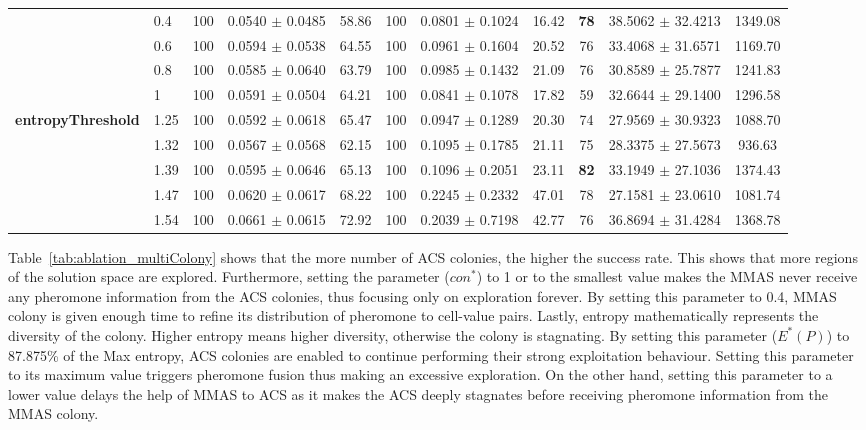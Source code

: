 \begin{table}[H]
{\begin{tabular}{@{}llccc ccc ccc@{}}
        & 0.4  & 100 & 0.0540 $\pm$ 0.0485 & 58.86 & 100 & 0.0801 $\pm$ 0.1024 & 16.42 & \textbf{78} & 38.5062 $\pm$ 32.4213 & 1349.08 \\
        & 0.6  & 100 & 0.0594 $\pm$ 0.0538 & 64.55 & 100 & 0.0961 $\pm$ 0.1604 & 20.52 & 76 & 33.4068 $\pm$ 31.6571 & 1169.70 \\
        & 0.8  & 100 & 0.0585 $\pm$ 0.0640 & 63.79 & 100 & 0.0985 $\pm$ 0.1432 & 21.09 & 76 & 30.8589 $\pm$ 25.7877 & 1241.83 \\
        & 1    & 100 & 0.0591 $\pm$ 0.0504 & 64.21 & 100 & 0.0841 $\pm$ 0.1078 & 17.82 & 59 & 32.6644 $\pm$ 29.1400 & 1296.58 \\
        \midrule
        \multirow{5}{*}{\textbf{entropyThreshold}} 
        & 1.25 & 100 & 0.0592 $\pm$ 0.0618 & 65.47 & 100 & 0.0947 $\pm$ 0.1289 & 20.30 & 74 & 27.9569 $\pm$ 30.9323 & 1088.70 \\
        & 1.32 & 100 & 0.0567 $\pm$ 0.0568 & 62.15 & 100 & 0.1095 $\pm$ 0.1785 & 21.11 & 75 & 28.3375 $\pm$ 27.5673 & 936.63 \\
        & 1.39 & 100 & 0.0595 $\pm$ 0.0646 & 65.13 & 100 & 0.1096 $\pm$ 0.2051 & 23.11 & \textbf{82} & 33.1949 $\pm$ 27.1036 & 1374.43 \\
        & 1.47 & 100 & 0.0620 $\pm$ 0.0617 & 68.22 & 100 & 0.2245 $\pm$ 0.2332 & 47.01 & 78 & 27.1581 $\pm$ 23.0610 & 1081.74 \\
        & 1.54 & 100 & 0.0661 $\pm$ 0.0615 & 72.92 & 100 & 0.2039 $\pm$ 0.7198 & 42.77 & 76 & 36.8694 $\pm$ 31.4284 & 1368.78 \\
        \bottomrule
    \end{tabular}}
\end{table}

Table~\ref{tab:ablation_multiColony} shows that the more number of ACS colonies, the higher the success rate. This shows that more regions of the solution space are explored. Furthermore, setting the parameter ($con^*$) to 1 or to the smallest value makes the MMAS never receive any pheromone information from the ACS colonies, thus focusing only on exploration forever. By setting this parameter to 0.4, MMAS colony is given enough time to refine its distribution of pheromone to cell-value pairs. Lastly, entropy mathematically represents the diversity of the colony. Higher entropy means higher diversity, otherwise the colony is stagnating. By setting this parameter ($E^*(P)$) to 87.875\% of the Max entropy, ACS colonies are enabled to continue performing their strong exploitation behaviour. Setting this parameter to its maximum value triggers pheromone fusion thus making an excessive exploration. On the other hand, setting this parameter to a lower value delays the help of MMAS to ACS as it makes the ACS deeply stagnates before receiving pheromone information from the MMAS colony. 


